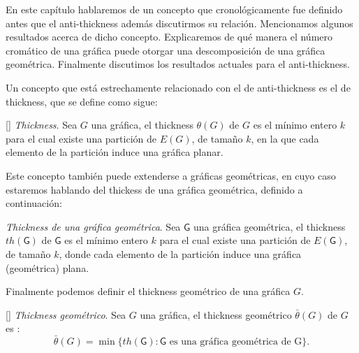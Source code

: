 

En este capítulo hablaremos de un concepto que cronológicamente fue definido antes
que el anti-thickness además discutirmos su relación. Mencionamos algunos resultados acerca
de dicho concepto. Explicaremos de qué manera el número cromático de una
gráfica puede otorgar una descomposición de una gráfica geométrica. Finalmente
discutimos los resultados actuales para el anti-thickness.

Un concepto que está estrechamente relacionado con el de anti-thickness es el
de thickness, que se define como sigue:
\begin{definition}{[\cite{Dillencourt2004}] \emph{Thickness}.}
  Sea $G$ una gráfica, el thickness $\theta(G)$ de $G$ es el mínimo entero $k$
  para el cual existe una partición de $E(G)$, de tamaño $k$, en la que cada
  elemento de la partición induce una gráfica planar.
\end{definition}
Este concepto también puede extenderse a gráficas geométricas, en cuyo caso
estaremos hablando del thickess de una gráfica geométrica, definido a continuación:
\begin{definition}{\emph{Thickness de una gráfica geométrica}.}
  Sea $\mathsf{G}$ una gráfica geométrica, el thickness $th(\mathsf{G})$
  de $\mathsf{G}$ es el mínimo entero $k$ para el cual existe una partición de $E(\mathsf{G})$,
  de tamaño $k$, donde cada elemento de la partición induce una
  gráfica (geométrica) plana.
\end{definition}
Finalmente podemos definir el thickness geométrico de una gráfica $G$.
\begin{definition}{[\cite{Dillencourt2004}] \emph{Thickness geométrico}.}
  Sea $G$ una gráfica, el thickness geométrico $\bar{\theta}(G)$ de $G$
  es : \[ \bar{\theta}(G) = \min\{th(\mathsf{G}): \mathsf{G} \text{ es una gráfica geométrica de G} \} .\]
\end{definition}


